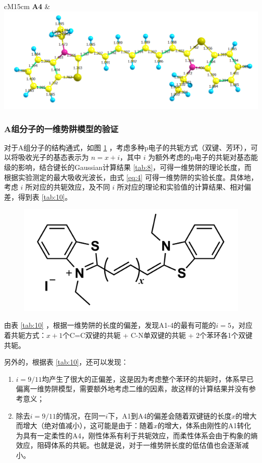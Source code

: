 \begin{table}[H]
\begin{tabular}{cM{15cm}}
    \textbf{A4} & \includegraphics[scale=.43]{figures3/3-1-4.png} \\
    \bottomrule
    \end{tabular}
    \label{tab:8}
\end{table}



\subsubsection{A组分子的一维势阱模型的验证}

对于A组分子的结构通式，如图 \ref{fig:13} ，考虑多种p电子的共轭方式（双键、芳环），可以将吸收光子的基态表示为 $n=x+i$，其中 $i$ 为额外考虑的p电子的共轭对基态能级的影响，结合键长的Gaussian计算结果 \ref{tab:8}，可得一维势阱的理论长度，而根据实验测定的最大吸收光波长，由式 \eqref{eq:4} 可得一维势阱的实验长度。具体地，考虑 $i$ 所对应的共轭效应，及不同 $i$ 所对应的理论和实验值的计算结果、相对偏差，得到表 \ref{tab:10}。

\begin{figure}[htbp]
    \centering
    \includegraphics[width=.35\textwidth]{figures3/3-2.png}
    \label{fig:13}
\end{figure}

由表 \ref{tab:10} ，根据一维势阱的长度的偏差，发现A1-4的最有可能的$i=5$，对应着共轭方式：$x+1$个C=C双键的共轭 + C-N单双键的共轭 + 2个苯环各1个双键共轭。

另外的，根据表 \ref{tab:10}，还可以发现：
\begin{enumerate}
    \item $i=9/11$均产生了很大的正偏差，这是因为考虑整个苯环的共轭时，体系早已偏离一维势阱模型，需要额外地考虑二维的因素，故这样的计算结果并没有参考意义；
    \item 除去$i=9/11$的情况，在同一$i$下，A1到A4的偏差会随着双键链的长度$x$的增大而增大（绝对值减小），这可能是由于：随着$x$的增大，体系由刚性的A1转化为具有一定柔性的A4，刚性体系有利于共轭效应，而柔性体系会由于构象的熵效应，阻碍体系的共轭。也就是说，对于一维势阱长度的低估值也会逐渐减小。
\end{enumerate}

